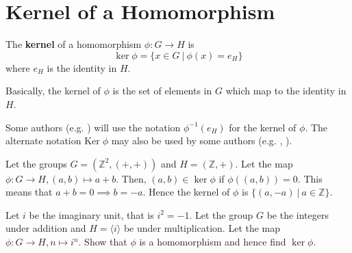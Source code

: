 \section{Kernel of a Homomorphism}
\begin{definition}
    The \textbf{kernel} of a homomorphism $\phi: G \to H$ is
    \[
        \ker\phi = \{x \in G \ | \ \phi(x) = e_H\}
    \]
    where $e_H$ is the identity in $H$.
\end{definition}
Basically, the kernel of $\phi$ is the set of elements in $G$ which map to the identity in $H$.

\begin{remark}
    Some authors (e.g. \cite{libretexts_imandker}) will use the notation $\phi^{-1}(e_H)$ for the kernel of $\phi$. The alternate notation $\mathrm{Ker}\;\phi$ may also be used by some authors (e.g. \cite{clark_1984}, \cite{hungerford_1980}).
\end{remark}

\begin{example}
    Let the groups $G = (\mathbb{Z}^2, (+, +))$ and $H = (\mathbb{Z}, +)$. Let the map $\phi: G \to H, (a, b) \mapsto a+b$. Then, $(a, b) \in \ker\phi$ if $\phi((a,b)) = 0$. This means that $a+b = 0 \implies b = -a$. Hence the kernel of $\phi$ is $\{(a, -a) \ | \ a \in \mathbb{Z}\}$.
\end{example}

\begin{exercise}
    Let $i$ be the imaginary unit, that is $i^2 = -1$. Let the group $G$ be the integers under addition and $H = \langle i \rangle$ be under multiplication. Let the map $\phi: G \to H, n \mapsto i^n$.  Show that $\phi$ is a homomorphism and hence find $\ker\phi$.
\end{exercise}

\newpage

